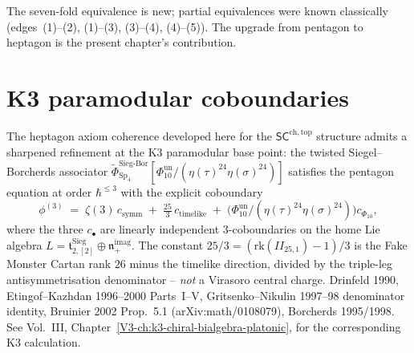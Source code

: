 The seven-fold equivalence is new; partial equivalences were known
classically (edges~(1)--(2), (1)--(3), (3)--(4), (4)--(5)). The
upgrade from pentagon to heptagon is the present chapter's
contribution.

\section{K3 paramodular coboundaries}
\label{sec:schtop-heptagon-supplement}

\begin{remark}
\label{rem:schtop-heptagon-1}
The heptagon axiom coherence developed here for the $\mathsf{SC}^{\mathrm{ch,top}}$
structure admits a sharpened refinement at the K3 paramodular base point:
the twisted Siegel--Borcherds associator
\(\widetilde{\Phi}^{\mathrm{Sieg\text{-}Bor}}_{\mathrm{Sp}_4}
[\Phi_{10}^{\mathrm{un}}/(\eta(\tau)^{24}\eta(\sigma)^{24})]\)
satisfies the pentagon equation at order $\hbar^{\le 3}$ with the
explicit coboundary
\[
\phi^{(3)} \;=\; \zeta(3)\,c_{\mathrm{symm}} \;+\; \tfrac{25}{3}\,c_{\mathrm{timelike}}
\;+\; \bigl(\Phi_{10}^{\mathrm{un}}/(\eta(\tau)^{24}\eta(\sigma)^{24})\bigr)c_{\Phi_{10}},
\]
where the three $c_{\bullet}$ are linearly independent $3$-coboundaries
on the home Lie algebra $L = \mathfrak t^{\mathrm{Sieg}}_{2,[2]}\oplus\mathfrak n_+^{\mathrm{imag}}$.
The constant $25/3 = (\mathrm{rk}(II_{25,1}) - 1)/3$ is the Fake
Monster Cartan rank $26$ minus the timelike direction, divided by the
triple-leg antisymmetrisation denominator -- \emph{not} a Virasoro
central charge. Drinfeld 1990, Etingof--Kazhdan 1996--2000 Parts~I--V,
Gritsenko--Nikulin 1997--98 denominator identity, Bruinier 2002
Prop.~5.1 (arXiv:math/0108079), Borcherds 1995/1998.
See Vol.~III, Chapter~\ref{V3-ch:k3-chiral-bialgebra-platonic},
for the corresponding K3 calculation.
\end{remark}

